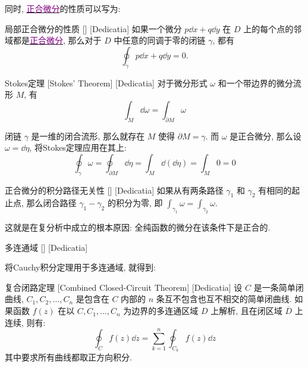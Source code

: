 \documentclass[UTF8]{ctexart}
\newcommand{\hyperrefc}[2]{\hyperref[#1]{\textcolor{purple}{#2}}}
\begin{document}
        同时, \hyperrefc{dfn:ExactDifferential}{正合微分}的性质可以写为: 

        \begin{ppt}
            [UUID]
            {局部正合微分的性质}
            []
            [Dedicatia]
            如果一个微分 \(p\dd{x}+q\dd{y}\) 在 \(D\) 上的每个点的邻域都是\hyperrefc{dfn:ExactDifferential}{正合微分}, 那么对于 \(D\) 中任意的同调于零的闭链 \(\gamma\), 都有
            \[\oint_\gamma p\dd{x}+q\dd{y}=0.\]
        \end{ppt}

        \begin{thm}
            [UUID]
            {Stokes定理}
            [Stokes' Theorem]
            [Dedicatia]
            对于微分形式 \(\omega\) 和一个带边界的微分流形 \(M\), 有
            \[\int_{M} \dd\omega = \int_{\partial M} \omega\]
        \end{thm}

        闭链 \(\gamma\) 是一维的闭合流形, 那么就存在 \(M\) 使得 \(\partial M=\gamma\). 而 \(\omega\) 是正合微分, 那么设 \(\omega=\dd{\eta}\), 将Stokes定理应用在其上: 
        \[\oint_{\gamma} \omega = \oint_{\partial M} \dd\eta = \int_{M} \dd(\dd\eta) = \int_{M} 0 = 0\]
        
        \begin{ppt}
            [UUID]
            {正合微分的积分路径无关性}
            []
            [Dedicatia]
            如果从有两条路径  \(\gamma_1\)  和  \(\gamma_2\) 有相同的起止点, 那么闭合路径  \(\gamma_1 - \gamma_2\)  的积分为零, 即  \(\int_{\gamma_1} \omega = \int_{\gamma_2} \omega\). 
        \end{ppt}

        这就是\CauchyThm 在复分析中成立的根本原因: 全纯函数的微分在该条件下是正合的. 

        \begin{dfn}
            [UUID]
            {多连通域}
            []
            [Dedicatia]
        \end{dfn}

        将Cauchy积分定理用于多连通域, 就得到: 

        \begin{thm}
            [CombinedClosedCircuit]
            {复合闭路定理}
            [Combined Closed-Circuit Theorem]
            [Dedicatia]
            设  \(C\)  是一条简单闭曲线,  \(C_1, C_2, \ldots, C_n\)  是包含在  \(C\)  内部的  \(n\)  条互不包含也互不相交的简单闭曲线. 如果函数  \(f(z)\)  在以  \(C, C_1, \ldots, C_n\)  为边界的多连通区域 \(D\) 上解析, 且在闭区域  \(\overline{D}\)  上连续, 则有: 
            \[\oint_C f(z) \dd z = \sum_{k=1}^n \oint_{C_k} f(z) \dd z\]
            其中要求所有曲线都取正方向积分. 
        \end{thm}
\end{document}
